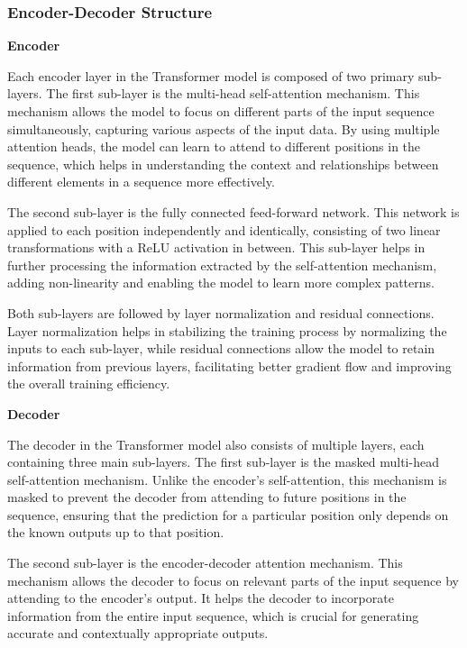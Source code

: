 \subsubsection{Encoder-Decoder Structure}

\noindent\textbf{Encoder}

\noindent Each encoder layer in the Transformer model is composed of two primary sub-layers. The first sub-layer is the multi-head self-attention mechanism. This mechanism allows the model to focus on different parts of the input sequence simultaneously, capturing various aspects of the input data. By using multiple attention heads, the model can learn to attend to different positions in the sequence, which helps in understanding the context and relationships between different elements in a sequence more effectively.

The second sub-layer is the fully connected feed-forward network. This network is applied to each position independently and identically, consisting of two linear transformations with a ReLU activation in between. This sub-layer helps in further processing the information extracted by the self-attention mechanism, adding non-linearity and enabling the model to learn more complex patterns.

Both sub-layers are followed by layer normalization and residual connections. Layer normalization helps in stabilizing the training process by normalizing the inputs to each sub-layer, while residual connections allow the model to retain information from previous layers, facilitating better gradient flow and improving the overall training efficiency.
\vspace{10pt}

\noindent\textbf{Decoder}

\noindent The decoder in the Transformer model also consists of multiple layers, each containing three main sub-layers. The first sub-layer is the masked multi-head self-attention mechanism. Unlike the encoder's self-attention, this mechanism is masked to prevent the decoder from attending to future positions in the sequence, ensuring that the prediction for a particular position only depends on the known outputs up to that position.

The second sub-layer is the encoder-decoder attention mechanism. This mechanism allows the decoder to focus on relevant parts of the input sequence by attending to the encoder's output. It helps the decoder to incorporate information from the entire input sequence, which is crucial for generating accurate and contextually appropriate outputs.

